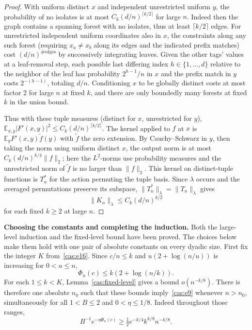 \begin{proof}
With uniform distinct \(x\) and independent unrestricted uniform \(y\), the probability of no isolates is at most \(C_k(d/n)^{\lceil k/2\rceil}\) for large \(n\). Indeed then the graph contains a spanning forest with no isolates, thus at least \(\lceil k/2\rceil\) edges. For unrestricted independent uniform coordinates also in \(x\), the constraints along any such forest (requiring \(x_a\ne x_b\) along its edges and the indicated prefix matches) cost \((d/n)^{\#\mathrm{edges}}\) by successively integrating leaves. Given the other tags' values at a leaf-removal step, each possible last differing index \(h\in\{1,\ldots,d\}\) relative to the neighbor of the leaf has probability \(2^{h-1}/n\) in \(x\) and the prefix match in \(y\) costs \(2^{-(h-1)}\), totaling \(d/n\). Conditioning \(x\) to be globally distinct costs at most factor 2 for large \(n\) at fixed \(k\), and there are only boundedly many forests at fixed \(k\) in the union bound.

Thus with these tuple measures (distinct for \(x\), unrestricted for \(y\)), \(\mathbb E_{x,y}|F'(x,y)|^2\le C_k(d/n)^{\lceil k/2\rceil}\). The kernel applied to \(f\) at \(x\) is \(\mathbb E_y F'(x,y)\widetilde f(y)\) with \(\widetilde f\) the zero extension. By Cauchy--Schwarz in \(y\), then taking the norm using uniform distinct \(x\), the output norm is at most \(C_k(d/n)^{k/4}\|f\|_2\); here the \(L^2\)-norms use probability measures and the unrestricted norm of \(\widetilde f\) is no larger than \(\|f\|_2\). This kernel on distinct-tuple functions is \(T_n^*\) for the action permuting the tuple basis. Since \(\lambda\) occurs and the averaged permutations preserve its subspace, \(\|T_n^*\|_\lambda=\|T_n\|_\lambda\) gives
\[
\|K_n\|_\lambda\le C_k(d/n)^{k/2}
\]
for each fixed \(k\ge2\) at large \(n\).

\end{proof}

\medskip\noindent\textbf{Choosing the constants and completing the induction.}\enspace
Both the large-level induction and the fixed-level bound have been
proved.  The choices below make them hold with one pair of absolute
constants on every dyadic size.
First fix the integer $K$ from~\eqref{cas:e16}. Since $c/n\le k$ and
$u(2+\log(n/u))$ is increasing for $0<u\le n$,
\[
 \Phi_n(c)\le k(2+\log(n/k)).
\]
For each $1\le k<K$, Lemma~\ref{cas:fixed-level} gives a bound
$o(n^{-k/8})$. There is therefore one absolute $n_0$ such that these
bounds imply~\eqref{cas:e9} whenever $n>n_0$, simultaneously for
all $1<B\le2$ and $0<\eta\le1/8$. Indeed throughout those ranges,
\[
 B^{-1}e^{-\eta\Phi_n(c)}
 \ge\tfrac12 e^{-k/4}k^{k/8}n^{-k/8}.
\]

